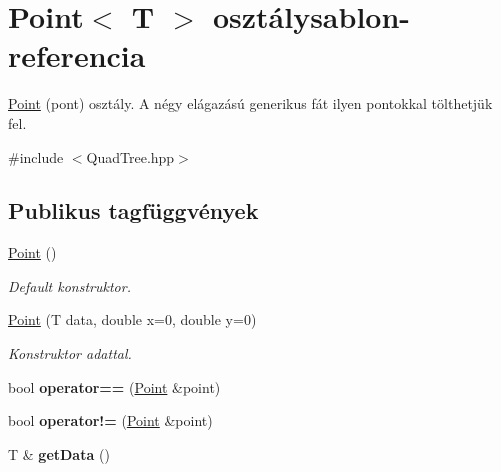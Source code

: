 \hypertarget{class_point}{\section{Point$<$ T $>$ osztálysablon-\/referencia}
\label{class_point}
}


\hyperlink{class_point}{Point} (pont) osztály. A négy elágazású generikus fát ilyen pontokkal tölthetjük fel.  




{\ttfamily \#include $<$Quad\-Tree.\-hpp$>$}

\subsection*{Publikus tagfüggvények}
\begin{DoxyCompactItemize}
\item 
\hypertarget{class_point_aea76b1130f1a203722d8f2254ced8e66}{\hyperlink{class_point_aea76b1130f1a203722d8f2254ced8e66}{Point} ()}\label{class_point_aea76b1130f1a203722d8f2254ced8e66}

\begin{DoxyCompactList}\small\item\em Default konstruktor. \end{DoxyCompactList}\item 
\hypertarget{class_point_a2305339234dc2f807f221ddcec4adf17}{\hyperlink{class_point_a2305339234dc2f807f221ddcec4adf17}{Point} (T data, double x=0, double y=0)}\label{class_point_a2305339234dc2f807f221ddcec4adf17}

\begin{DoxyCompactList}\small\item\em Konstruktor adattal. \end{DoxyCompactList}\item 
\hypertarget{class_point_a58360c2ad404143affafa09d1b512653}{bool {\bfseries operator==} (\hyperlink{class_point}{Point} \&point)}\label{class_point_a58360c2ad404143affafa09d1b512653}

\item 
\hypertarget{class_point_aca0bf5d6cbf1b0e6a0c49ec44b4605e5}{bool {\bfseries operator!=} (\hyperlink{class_point}{Point} \&point)}\label{class_point_aca0bf5d6cbf1b0e6a0c49ec44b4605e5}

\item 
\hypertarget{class_point_ab012e5bfa40306e6d07abb3075e229ee}{T \& {\bfseries get\-Data} ()}\label{class_point_ab012e5bfa40306e6d07abb3075e229ee}

\end{DoxyCompactItemize}
